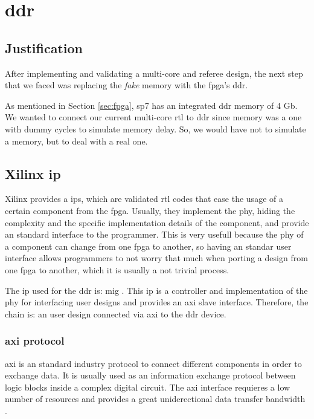 \section{\acrshort{ddr}}
\subsection{Justification}
After implementing and validating a multi-core and referee design, the next step that we faced was replacing the \textit{fake} memory with the \gls{fpga}'s \gls{ddr}.

As mentioned in Section \ref{sec:fpga}, \gls{sp7} has an integrated \gls{ddr} memory of 4 Gb.
We wanted to connect our current multi-core \gls{rtl} to \gls{ddr} since memory was a one with dummy cycles to simulate memory delay. 
So, we would have not to simulate a memory, but to deal with a real one.


\subsection{Xilinx \acrshort{ip}}
Xilinx provides a \glspl{ip}, which are validated \gls{rtl} codes that ease the usage of a certain component from the \gls{fpga}. 
Usually, they implement the \gls{phy}, hiding the complexity and the specific implementation details of the component, and provide an standard interface to the programmer. 
This is very usefull because the \gls{phy} of a component can change from one \gls{fpga} to another, so having an standar user interface allows programmers to not worry that much when porting a design from one \gls{fpga} to another, which it is usually a not trivial process.

The \gls{ip} used for the \gls{ddr} is: \gls{mig} \cite{mig}.
This \gls{ip} is a controller and implementation of the \gls{phy} for interfacing user designs and provides an \gls{axi} slave interface.
Therefore, the chain is: an user design connected via \gls{axi} to the \gls{ddr} device.

\subsubsection{\acrshort{axi} protocol}
\acrlong{axi} is an standard industry protocol to connect different components in order to exchange data.
It is usually used as an information exchange protocol between logic blocks inside a complex digital circuit.
The \gls{axi} interface requieres a low number of resources and provides a great uniderectional data transfer bandwidth \cite{axi}.

